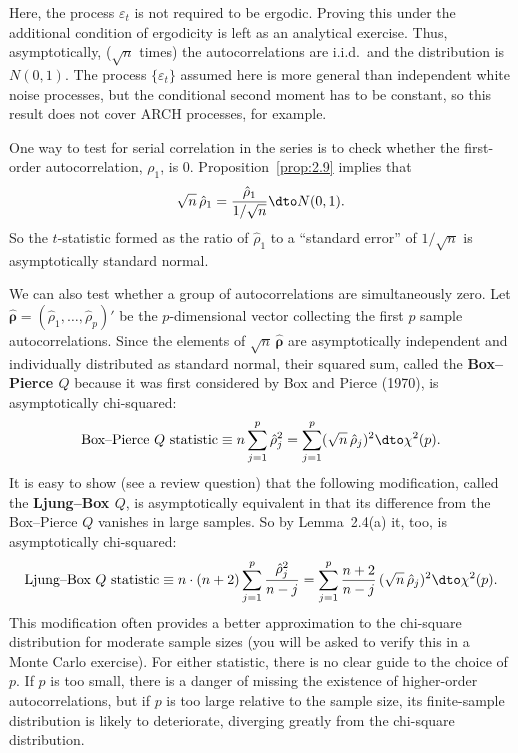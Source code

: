 Here, the process $\varepsilon_t$ is not required to be ergodic. Proving this under the additional
condition of ergodicity is left as an analytical exercise. Thus, asymptotically,
($\sqrt{n}$ times) the autocorrelations are i.i.d.\ and the distribution is $N(0, 1)$. The
process $\{\varepsilon_t\}$ assumed here is more general than independent white noise processes,
but the conditional second moment has to be constant, so this result does not cover
ARCH processes, for example.

One way to test for serial correlation in the series is to check whether the first-order autocorrelation, $\rho_1$, is 0. Proposition~\ref{prop:2.9} implies that
%
\begin{equation}
\sqrt{n}\,\hat{\rho}_1 = \frac{\hat{\rho}_1}{1/\sqrt{n}}
\dto N(0, 1).
\label{eq:2.10.3}
\end{equation}
%
So the $t$-statistic formed as the ratio of $\hat{\rho}_1$ to a ``standard error'' of $1/\sqrt{n}$
is asymptotically standard normal.

We can also test whether a group of autocorrelations are simultaneously zero.
Let $\hat{\bm{\rho}} = (\hat{\rho}_1, \ldots, \hat{\rho}_p)'$ be the $p$-dimensional vector collecting the first $p$ sample
autocorrelations. Since the elements of $\sqrt{n}\,\hat{\bm{\rho}}$ are asymptotically independent and
individually distributed as standard normal, their squared sum, called the \textbf{Box--Pierce $Q$} because it was first considered by Box and Pierce (1970), is asymptotically
chi-squared:
%
\begin{equation}
\text{Box--Pierce } Q \text{ statistic}
\equiv n \sum_{j=1}^{p}\hat{\rho}_j^2
= \sum_{j=1}^{p}(\sqrt{n}\,\hat{\rho}_j)^2
\dto \chi^2(p).
\label{eq:2.10.4}
\end{equation}
%
It is easy to show (see a review question) that the following modification, called
the \textbf{Ljung--Box $Q$}, is asymptotically equivalent in that its difference from the Box--Pierce $Q$ vanishes in large samples. So by Lemma~2.4(a) it, too, is asymptotically
chi-squared:
%
\begin{equation}
\text{Ljung--Box } Q \text{ statistic}
\equiv n \cdot (n+2) \sum_{j=1}^{p}\frac{\hat{\rho}_j^2}{n - j}
= \sum_{j=1}^{p}\frac{n+2}{n-j}\,(\sqrt{n}\,\hat{\rho}_j)^2
\dto \chi^2(p).
\label{eq:2.10.5}
\end{equation}
%
This modification often provides a better approximation to the chi-square distribution for moderate sample sizes (you will be asked to verify this in a Monte Carlo
exercise). For either statistic, there is no clear guide to the choice of $p$. If $p$ is too
small, there is a danger of missing the existence of higher-order autocorrelations,
but if $p$ is too large relative to the sample size, its finite-sample distribution is likely
to deteriorate, diverging greatly from the chi-square distribution.

